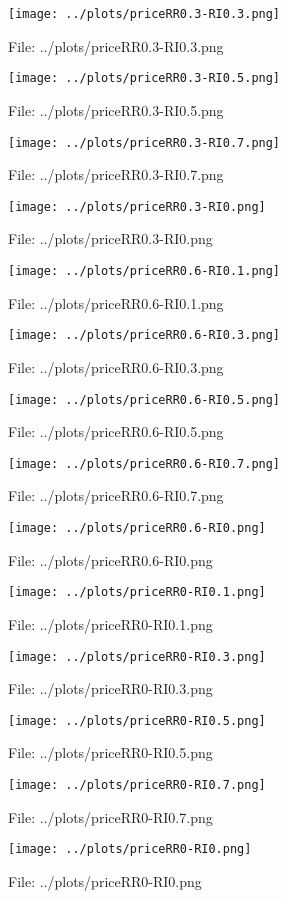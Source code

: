 \documentclass[a4paper, 11pt]{report}
\begin{document}
\begin{figure}[h] \caption{File: ../plots/priceRR0.3-RI0.3.png} \texttt{[image: ../plots/priceRR0.3-RI0.3.png]} \end{figure}
\begin{figure}[h] \caption{File: ../plots/priceRR0.3-RI0.5.png} \texttt{[image: ../plots/priceRR0.3-RI0.5.png]} \end{figure}
\begin{figure}[h] \caption{File: ../plots/priceRR0.3-RI0.7.png} \texttt{[image: ../plots/priceRR0.3-RI0.7.png]} \end{figure}
\begin{figure}[h] \caption{File: ../plots/priceRR0.3-RI0.png} \texttt{[image: ../plots/priceRR0.3-RI0.png]} \end{figure}
\begin{figure}[h] \caption{File: ../plots/priceRR0.6-RI0.1.png} \texttt{[image: ../plots/priceRR0.6-RI0.1.png]} \end{figure}
\begin{figure}[h] \caption{File: ../plots/priceRR0.6-RI0.3.png} \texttt{[image: ../plots/priceRR0.6-RI0.3.png]} \end{figure}
\begin{figure}[h] \caption{File: ../plots/priceRR0.6-RI0.5.png} \texttt{[image: ../plots/priceRR0.6-RI0.5.png]} \end{figure}
\begin{figure}[h] \caption{File: ../plots/priceRR0.6-RI0.7.png} \texttt{[image: ../plots/priceRR0.6-RI0.7.png]} \end{figure}
\begin{figure}[h] \caption{File: ../plots/priceRR0.6-RI0.png} \texttt{[image: ../plots/priceRR0.6-RI0.png]} \end{figure}
\begin{figure}[h] \caption{File: ../plots/priceRR0-RI0.1.png} \texttt{[image: ../plots/priceRR0-RI0.1.png]} \end{figure}
\begin{figure}[h] \caption{File: ../plots/priceRR0-RI0.3.png} \texttt{[image: ../plots/priceRR0-RI0.3.png]} \end{figure}
\begin{figure}[h] \caption{File: ../plots/priceRR0-RI0.5.png} \texttt{[image: ../plots/priceRR0-RI0.5.png]} \end{figure}
\begin{figure}[h] \caption{File: ../plots/priceRR0-RI0.7.png} \texttt{[image: ../plots/priceRR0-RI0.7.png]} \end{figure}
\begin{figure}[h] \caption{File: ../plots/priceRR0-RI0.png} \texttt{[image: ../plots/priceRR0-RI0.png]} \end{figure}
\end{document}
